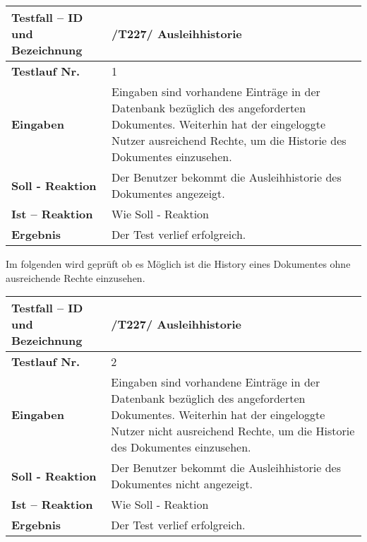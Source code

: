 \begin{longtable}{|p{5cm}|p{10cm}|}
\hline
\textbf{Testfall -- ID und Bezeichnung} & \textnormal{/T227/ Ausleihhistorie} \\
\hline
\textbf{Testlauf Nr.} & \textnormal{1} \\
\hline
\textbf{Eingaben} & \textnormal{Eingaben sind vorhandene Einträge in der Datenbank
bezüglich des angeforderten Dokumentes. Weiterhin hat der eingeloggte Nutzer
ausreichend Rechte, um die Historie des Dokumentes einzusehen. } \\
\hline
\textbf{Soll - Reaktion} & \textnormal{Der Benutzer bekommt die Ausleihhistorie des
Dokumentes angezeigt. } \\
\hline
\textbf{Ist -- Reaktion} & \textnormal{Wie Soll - Reaktion} \\
\hline
\textbf{Ergebnis} & \textnormal{Der Test verlief erfolgreich. } \\
\hline
 \end{longtable}

 Im folgenden wird geprüft ob es Möglich ist die History eines Dokumentes ohne
 ausreichende Rechte einzusehen.
\begin{longtable}{|p{5cm}|p{10cm}|}
\hline
\textbf{Testfall -- ID und Bezeichnung} & \textnormal{/T227/ Ausleihhistorie} \\
\hline
\textbf{Testlauf Nr.} & \textnormal{2} \\
\hline
\textbf{Eingaben} & \textnormal{Eingaben sind vorhandene Einträge in der Datenbank
bezüglich des angeforderten Dokumentes. Weiterhin hat der eingeloggte Nutzer
nicht ausreichend Rechte, um die Historie des Dokumentes einzusehen. } \\
\hline
\textbf{Soll - Reaktion} & \textnormal{Der Benutzer bekommt die Ausleihhistorie des
Dokumentes nicht angezeigt. } \\
\hline
\textbf{Ist -- Reaktion} & \textnormal{Wie Soll - Reaktion} \\
\hline
\textbf{Ergebnis} & \textnormal{Der Test verlief erfolgreich. } \\
\hline
 \end{longtable}
